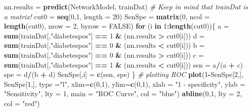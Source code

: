 \documentclass[
]{book}
\newenvironment{Shaded}{\begin{snugshade}}{\end{snugshade}}
\newcommand{\AttributeTok}[1]{\textcolor[rgb]{0.13,0.29,0.53}{#1}}
\newcommand{\CommentTok}[1]{\textcolor[rgb]{0.56,0.35,0.01}{\textit{#1}}}
\newcommand{\ConstantTok}[1]{\textcolor[rgb]{0.56,0.35,0.01}{#1}}
\newcommand{\ControlFlowTok}[1]{\textcolor[rgb]{0.13,0.29,0.53}{\textbf{#1}}}
\newcommand{\DecValTok}[1]{\textcolor[rgb]{0.00,0.00,0.81}{#1}}
\newcommand{\FunctionTok}[1]{\textcolor[rgb]{0.13,0.29,0.53}{\textbf{#1}}}
\newcommand{\NormalTok}[1]{#1}
\newcommand{\OtherTok}[1]{\textcolor[rgb]{0.56,0.35,0.01}{#1}}
\newcommand{\SpecialCharTok}[1]{\textcolor[rgb]{0.81,0.36,0.00}{\textbf{#1}}}
\newcommand{\StringTok}[1]{\textcolor[rgb]{0.31,0.60,0.02}{#1}}
\begin{document}
\begin{Shaded}
\begin{Highlighting}[]
\NormalTok{nn.results }\OtherTok{=} \FunctionTok{predict}\NormalTok{(NetworkModel, trainDat)  }\CommentTok{\# Keep in mind that trainDat is a matrix!}
\NormalTok{cut0 }\OtherTok{=} \FunctionTok{seq}\NormalTok{(}\DecValTok{0}\NormalTok{,}\DecValTok{1}\NormalTok{, }\AttributeTok{length =} \DecValTok{20}\NormalTok{)}
\NormalTok{SenSpe }\OtherTok{=} \FunctionTok{matrix}\NormalTok{(}\DecValTok{0}\NormalTok{, }\AttributeTok{ncol =} \FunctionTok{length}\NormalTok{(cut0), }\AttributeTok{nrow =} \DecValTok{2}\NormalTok{, }\AttributeTok{byrow =} \ConstantTok{FALSE}\NormalTok{)}
\ControlFlowTok{for}\NormalTok{ (i }\ControlFlowTok{in} \DecValTok{1}\SpecialCharTok{:}\FunctionTok{length}\NormalTok{(cut0))\{}
\NormalTok{    a }\OtherTok{=} \FunctionTok{sum}\NormalTok{(trainDat[,}\StringTok{"diabetespos"}\NormalTok{] }\SpecialCharTok{==} \DecValTok{1} \SpecialCharTok{\&}\NormalTok{ (nn.results }\SpecialCharTok{\textgreater{}}\NormalTok{ cut0[i]))}
\NormalTok{    d }\OtherTok{=} \FunctionTok{sum}\NormalTok{(trainDat[,}\StringTok{"diabetespos"}\NormalTok{] }\SpecialCharTok{==} \DecValTok{0} \SpecialCharTok{\&}\NormalTok{ (nn.results }\SpecialCharTok{\textless{}}\NormalTok{ cut0[i]))}
\NormalTok{    b }\OtherTok{=} \FunctionTok{sum}\NormalTok{(trainDat[,}\StringTok{"diabetespos"}\NormalTok{] }\SpecialCharTok{==} \DecValTok{0} \SpecialCharTok{\&}\NormalTok{ (nn.results }\SpecialCharTok{\textgreater{}}\NormalTok{ cut0[i]))    }
\NormalTok{    c }\OtherTok{=} \FunctionTok{sum}\NormalTok{(trainDat[,}\StringTok{"diabetespos"}\NormalTok{] }\SpecialCharTok{==} \DecValTok{1} \SpecialCharTok{\&}\NormalTok{ (nn.results }\SpecialCharTok{\textless{}}\NormalTok{ cut0[i]))   }
\NormalTok{    sen }\OtherTok{=}\NormalTok{ a}\SpecialCharTok{/}\NormalTok{(a }\SpecialCharTok{+}\NormalTok{ c)}
\NormalTok{    spe }\OtherTok{=}\NormalTok{ d}\SpecialCharTok{/}\NormalTok{(b }\SpecialCharTok{+}\NormalTok{ d)}
\NormalTok{    SenSpe[,i] }\OtherTok{=} \FunctionTok{c}\NormalTok{(sen, spe)}
\NormalTok{\}}
\CommentTok{\# plotting ROC}
\FunctionTok{plot}\NormalTok{(}\DecValTok{1}\SpecialCharTok{{-}}\NormalTok{SenSpe[}\DecValTok{2}\NormalTok{,], SenSpe[}\DecValTok{1}\NormalTok{,], }\AttributeTok{type =}\StringTok{"l"}\NormalTok{, }\AttributeTok{xlim=}\FunctionTok{c}\NormalTok{(}\DecValTok{0}\NormalTok{,}\DecValTok{1}\NormalTok{), }\AttributeTok{ylim=}\FunctionTok{c}\NormalTok{(}\DecValTok{0}\NormalTok{,}\DecValTok{1}\NormalTok{),}
     \AttributeTok{xlab =} \StringTok{"1 {-} specificity"}\NormalTok{, }\AttributeTok{ylab =} \StringTok{"Sensitivity"}\NormalTok{, }\AttributeTok{lty =} \DecValTok{1}\NormalTok{,}
     \AttributeTok{main =} \StringTok{"ROC Curve"}\NormalTok{, }\AttributeTok{col =} \StringTok{"blue"}\NormalTok{)}
\FunctionTok{abline}\NormalTok{(}\DecValTok{0}\NormalTok{,}\DecValTok{1}\NormalTok{, }\AttributeTok{lty =} \DecValTok{2}\NormalTok{, }\AttributeTok{col =} \StringTok{"red"}\NormalTok{)}


\end{Highlighting}
\end{Shaded}
\end{document}
